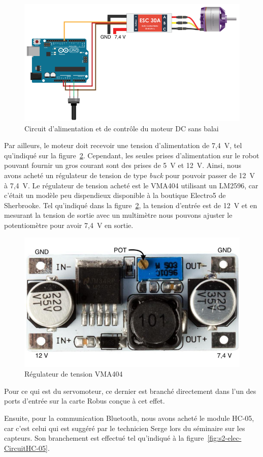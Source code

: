 \begin{figure}[t]
    \centering
    \includegraphics[width=0.7\linewidth]{img/s2/elec/CircuitMoteurDC}
    \caption{Circuit d'alimentation et de contrôle du moteur DC sans balai}
    \label{fig:s2-elec-CircuitMoteurDC}
\end{figure}

Par ailleurs, le moteur doit recevoir une tension d’alimentation de 7,4~V, tel qu'indiqué sur la figure~\ref{fig:s2-elec-RegulateurTension}.
Cependant, les seules prises d’alimentation sur le robot pouvant fournir un gros courant sont des prises de 5~V et 12~V.
Ainsi, nous avons acheté un régulateur de tension de type \emph{buck} pour pouvoir passer de 12~V à 7,4~V.
Le régulateur de tension acheté est le VMA404 utilisant un LM2596, car c’était un modèle peu dispendieux disponible à la boutique Electro5 de Sherbrooke.
Tel qu'indiqué dans la figure~\ref{fig:s2-elec-RegulateurTension}, la tension d’entrée est de 12~V et en mesurant la tension de sortie avec un multimètre nous pouvons ajuster le potentiomètre pour avoir 7,4~V en sortie.

\begin{figure}[h!]
    \centering
    \includegraphics[width=0.4\linewidth]{img/s2/elec/RegulateurTension}
    \caption{Régulateur de tension VMA404}
    \label{fig:s2-elec-RegulateurTension}
\end{figure}

Pour ce qui est du servomoteur, ce dernier est branché directement dans l’un des ports d’entrée sur la carte Robus conçue à cet effet.

Ensuite, pour la communication Bluetooth, nous avons acheté le module HC-05, car c’est celui qui est suggéré par le technicien Serge lors du séminaire sur les capteurs.
Son branchement est effectué tel qu'indiqué à la figure~\ref{fig:s2-elec-CircuitHC-05}.

